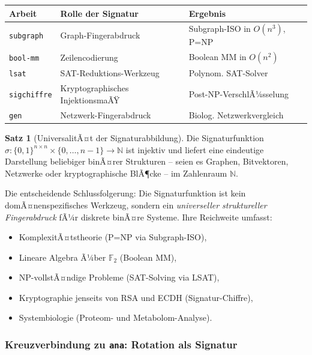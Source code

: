 ﻿\documentclass[a4paper,12pt]{scrreprt}
\theoremstyle{definition}
\newtheorem{satz}{Satz}[section]
\begin{document}
\begin{center}
\begin{tabular}{lll}
\toprule
\textbf{Arbeit} & \textbf{Rolle der Signatur} & \textbf{Ergebnis} \\
\midrule
\texttt{subgraph} & Graph-Fingerabdruck & Subgraph-ISO in $O(n^3)$, P=NP \\
\texttt{bool-mm}  & Zeilencodierung     & Boolean MM in $O(n^2)$ \\
\texttt{lsat}     & SAT-Reduktions-Werkzeug & Polynom. SAT-Solver \\
\texttt{sigchiffre} & Kryptographisches InjektionsmaÃŸ & Post-NP-VerschlÃ¼sselung \\
\texttt{gen}      & Netzwerk-Fingerabdruck & Biolog. Netzwerkvergleich \\
\bottomrule
\end{tabular}
\end{center}

\begin{satz}[UniversalitÃ¤t der Signaturabbildung]
  Die Signaturfunktion $\sigma: \{0,1\}^{n \times n} \times \{0,\ldots,n-1\}
  \to \mathbb{N}$ ist injektiv und liefert eine eindeutige Darstellung beliebiger
  binÃ¤rer Strukturen -- seien es Graphen, Bitvektoren, Netzwerke oder
  kryptographische BlÃ¶cke -- im Zahlenraum $\mathbb{N}$.
\end{satz}

Die entscheidende Schlussfolgerung: Die Signaturfunktion ist kein
domÃ¤nenspezifisches Werkzeug, sondern ein \emph{universeller struktureller
Fingerabdruck} fÃ¼r diskrete binÃ¤re Systeme. Ihre Reichweite umfasst:

\begin{itemize}
  \item KomplexitÃ¤tstheorie (P=NP via Subgraph-ISO),
  \item Lineare Algebra Ã¼ber $\mathbb{F}_2$ (Boolean MM),
  \item NP-vollstÃ¤ndige Probleme (SAT-Solving via LSAT),
  \item Kryptographie jenseits von RSA und ECDH (Signatur-Chiffre),
  \item Systembiologie (Proteom- und Metabolom-Analyse).
\end{itemize}

\subsubsection{Kreuzverbindung zu \texttt{ana}: Rotation als Signatur}
\end{document}
